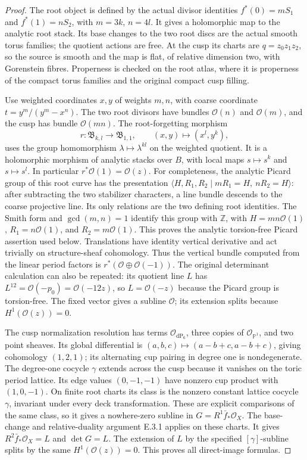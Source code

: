 \begin{proof}
The root object is defined by the actual divisor identities
$f^*(0)=mS_1$ and $f^*(1)=nS_2$, with $m=3k$, $n=4l$.
It gives a holomorphic map to the analytic root stack.  Its base
changes to the two root discs are the actual smooth torus
families; the quotient actions are free.  At the cusp its charts
are $q=z_0z_1z_2$, so the source is smooth and the map is flat,
of relative dimension two, with Gorenstein fibres.  Properness is
checked on the root atlas, where it is properness of the compact
torus families and the original compact cusp filling.

Use weighted coordinates $x,y$ of weights $m,n$, with coarse
coordinate $t=y^m/(y^m-x^n)$.
The two root divisors have bundles $\mathcal O(n)$ and
$\mathcal O(m)$, and the cusp has bundle $\mathcal O(mn)$.
The root-forgetting morphism
\[
 r:\mathfrak B_{k,l}\longrightarrow\mathfrak B_{1,1},
 \qquad (x,y)\longmapsto(x^l,y^k),
\]
uses the group homomorphism $\lambda\mapsto\lambda^{kl}$ on
the weighted quotient.  It is a holomorphic morphism of analytic
stacks over $B$, with local maps $s\mapsto s^k$ and
$s\mapsto s^l$.  In particular $r^*\mathcal O(1)=\mathcal O(z)$.
For completeness, the analytic Picard group of this root curve has
the presentation
$\langle H,R_1,R_2\mid mR_1=H,\ nR_2=H\rangle$:
after subtracting the two stabilizer characters, a line bundle
descends to the coarse projective line.  Its only relations are
the two defining root identities.  The Smith form and
$\gcd(m,n)=1$ identify this group with $\mathbb Z$, with
$H=mn\mathcal O(1)$, $R_1=n\mathcal O(1)$, and
$R_2=m\mathcal O(1)$.  This proves the analytic torsion-free
Picard assertion used below.
Translations have identity vertical derivative and act trivially
on structure-sheaf cohomology.  Thus the vertical bundle computed
from the linear period factors is $r^*(\mathcal O\oplus
\mathcal O(-1))$.  The original determinant calculation can also
be repeated: its quotient line $L$ has
$L^{12}=\mathcal O(-p_0)=\mathcal O(-12z)$, so
$L=\mathcal O(-z)$ because the Picard group is torsion-free.
The fixed vector gives a subline $\mathcal O$; its extension
splits because $H^1(\mathcal O(z))=0$.

The cusp normalization resolution has terms
$\mathcal O_{\mathrm{dP}_6}$, three copies of
$\mathcal O_{\mathbb P^1}$, and two point sheaves.
Its global differential is $(a,b,c)\mapsto
(a-b+c,a-b+c)$, giving cohomology $(1,2,1)$; its alternating cup
pairing in degree one is nondegenerate.  The degree-one cocycle
$\gamma$ extends across the cusp because it vanishes on the toric
period lattice.  Its edge values $(0,-1,-1)$ have nonzero cup
product with $(1,0,-1)$.  On finite root charts its class is the
nonzero constant lattice cocycle $\gamma$, invariant under every
deck transformation.  These are explicit comparisons of the
same class, so it gives a nowhere-zero subline in
$G=R^1\bar f_*\mathcal O_X$.
The base-change and relative-duality argument E.3.1 applies on
these charts.  It gives $R^2\bar f_*\mathcal O_X=L$ and
$\det G=L$.  The extension of $L$ by the specified
$[\gamma]$-subline splits by the same $H^1(\mathcal O(z))=0$.
This proves all direct-image formulas.


\end{proof}
